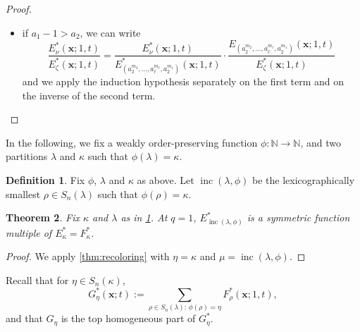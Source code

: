 \documentclass[12pt]{amsart}
\newtheorem{thm}{Theorem}[section]
\theoremstyle{definition}
\newtheorem{definition}[thm]{Definition}
\newcommand{\bfx}{\boldsymbol{x}}
\DeclareMathOperator{\inc}{inc}
\newcommand{\NN}{\mathbb N}
\def\LW#1{(\textcolor{teal}{LW:#1})}
\def\HBD#1{(\textcolor{violet}{HBD:#1})}
\begin{document}
\begin{appendices}
\begin{proof}
\begin{itemize}
    
    \item if $a_1-1>a_2$, we can write
    $$\frac{E^*_{\nu}(\bfx;1,t)}{E^*_{\zeta}(\bfx;1,t)}=
    \frac{E^*_{\nu}(\bfx;1,t)}{E^*_{(a_2^{m_2},\dots,a_\ell^{m_\ell},a_2^{m_1})}(\bfx;1,t)}\cdotp
    \frac{E_{(a_2^{m_2},\dots,a_\ell^{m_\ell},a_2^{m_1})}(\bfx;1,t)}{E^*_{\zeta}(\bfx;1,t)}$$
    and we apply the induction hypothesis separately on the first term and on the inverse of the second term.\qedhere
\end{itemize}
\end{proof} 


In the following, we fix a weakly order-preserving function $\phi:\NN\rightarrow\NN$, and two partitions $\lambda$ and $\kappa$ such that $\phi(\lambda)=\kappa$.


\begin{definition}\label{def:inc}
Fix $\phi$, $\lambda$ and $\kappa$ as above.
Let $\inc(\lambda,\phi)$ be the lexicographically smallest $\rho\in S_n(\lambda)$ such that $\phi(\rho)=\kappa$. 
\end{definition}

\begin{thm}\label{thm:E_inc_E}
    Fix $\kappa$ and $\lambda$ as in \cref{def:inc}. At $q=1$, $E^*_{\inc(\lambda,\phi)}$
    is a symmetric function multiple of $E^*_\kappa=F^*_\kappa$.
    \end{thm}
 
\begin{proof}
    We apply \cref{thm:recoloring} with $\eta=\kappa$ and $\mu=\inc(\lambda,\phi)$.
\end{proof}


Recall that for $\eta\in S_n(\kappa)$, 
\begin{equation}\label{eq:G}
G^*_\eta(\bfx;t):=\sum_{\rho\in S_n(\lambda):\, \phi(\rho)=\eta} F^*_\rho(\bfx;1,t),
\end{equation}
and that $G_{\eta}$ is the top homogeneous part of $G^*_\eta$.


\end{appendices}
\end{document}
